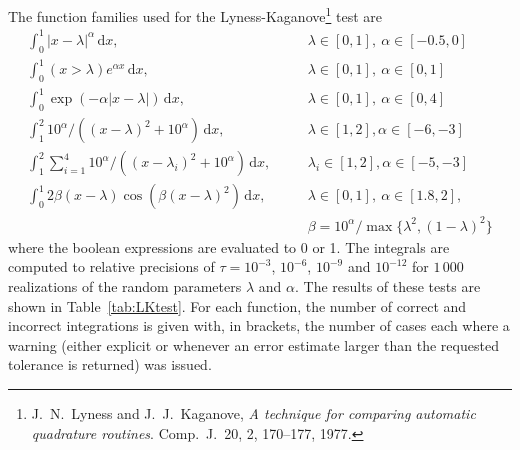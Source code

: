 \documentclass[]{article}
\begin{document}
The function families used for the Lyness-Kaganove\footnote{J.~N.~Lyness and J.~J.~Kaganove, {\em A technique for comparing automatic quadrature
routines}. Comp.~J.~20, 2, 170--177, 1977.} test are
%
\begin{eqnarray}
    \int_0^1 |x-\lambda|^\alpha\,\mbox{d}x,\quad & & \lambda \in [0,1],\ \alpha \in [-0.5,0] \label{eqn:val_sing} \\
    \int_0^1 (x>\lambda) e^{\alpha x}\,\mbox{d}x,\quad & & \lambda \in [0,1],\ \alpha \in [0,1] \label{eqn:val_disc} \\
    \int_0^1 \exp (-\alpha|x-\lambda|)\,\mbox{d}x,\quad & & \lambda \in [0,1],\ \alpha \in [0,4] \label{eqn:val_c0} \\
    \int_1^2 10^\alpha / ((x-\lambda)^2 + 10^\alpha)\,\mbox{d}x,\quad & & \lambda \in [1,2], \alpha \in [-6,-3] \label{eqn:val_peak} \\
    \int_1^2 \sum_{i=1}^4 10^\alpha / ((x-\lambda_i)^2 + 10^\alpha)\,\mbox{d}x,\quad & & \lambda_i \in [1,2], \alpha \in [-5,-3] \label{eqn:val_4peak} \\
    \int_0^1 2\beta(x-\lambda)\cos(\beta(x-\lambda)^2)\,\mbox{d}x, \quad & & \lambda \in [0,1],\ \alpha \in [1.8,2], \label{eqn:val_oscill} \\
    & & \beta = 10^\alpha/\max\{\lambda^2,(1-\lambda)^2\} \nonumber
\end{eqnarray}
%
where the boolean expressions are evaluated to 0 or 1.
The integrals are computed to relative precisions of $\tau=10^{-3}$,
$10^{-6}$, $10^{-9}$ and $10^{-12}$ for $1\,000$ realizations
of the random parameters $\lambda$ and $\alpha$.
The results of these tests are shown in Table~\ref{tab:LKtest}.
For each function, the number of correct and incorrect integrations
is given with, in brackets, the number of cases each where a warning
(either explicit or whenever an error estimate larger than the requested
tolerance is returned) was issued.
\end{document}
